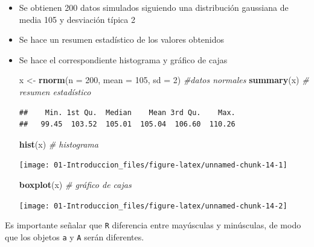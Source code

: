 \documentclass[]{book}
\newenvironment{Shaded}{\begin{snugshade}}{\end{snugshade}}
\newcommand{\KeywordTok}[1]{\textcolor[rgb]{0.13,0.29,0.53}{\textbf{#1}}}
\newcommand{\DataTypeTok}[1]{\textcolor[rgb]{0.13,0.29,0.53}{#1}}
\newcommand{\DecValTok}[1]{\textcolor[rgb]{0.00,0.00,0.81}{#1}}
\newcommand{\StringTok}[1]{\textcolor[rgb]{0.31,0.60,0.02}{#1}}
\newcommand{\CommentTok}[1]{\textcolor[rgb]{0.56,0.35,0.01}{\textit{#1}}}
\newcommand{\NormalTok}[1]{#1}
\begin{document}
\begin{itemize}
\item
  Se obtienen 200 datos simulados siguiendo una distribución gaussiana
  de media 105 y desviación típica 2
\item
  Se hace un resumen estadístico de los valores obtenidos
\item
  Se hace el correspondiente histograma y gráfico de cajas

\begin{Shaded}
\begin{Highlighting}[]
\NormalTok{x <-}\StringTok{ }\KeywordTok{rnorm}\NormalTok{(}\DataTypeTok{n =} \DecValTok{200}\NormalTok{, }\DataTypeTok{mean =} \DecValTok{105}\NormalTok{, }\DataTypeTok{sd =} \DecValTok{2}\NormalTok{) }\CommentTok{#datos normales}
\KeywordTok{summary}\NormalTok{(x) }\CommentTok{# resumen estadístico}
\end{Highlighting}
\end{Shaded}

\begin{verbatim}
##    Min. 1st Qu.  Median    Mean 3rd Qu.    Max. 
##   99.45  103.52  105.01  105.04  106.60  110.26
\end{verbatim}

\begin{Shaded}
\begin{Highlighting}[]
\KeywordTok{hist}\NormalTok{(x) }\CommentTok{# histograma}
\end{Highlighting}
\end{Shaded}

  \begin{center}\texttt{[image: 01-Introduccion\_files/figure-latex/unnamed-chunk-14-1]} \end{center}

\begin{Shaded}
\begin{Highlighting}[]
\KeywordTok{boxplot}\NormalTok{(x) }\CommentTok{# gráfico de cajas}
\end{Highlighting}
\end{Shaded}

  \begin{center}\texttt{[image: 01-Introduccion\_files/figure-latex/unnamed-chunk-14-2]} \end{center}
\end{itemize}

Es importante señalar que \texttt{R} diferencia entre mayúsculas y
minúsculas, de modo que los objetos \texttt{a} y \texttt{A} serán
diferentes.
\end{document}
